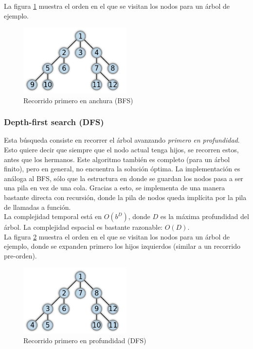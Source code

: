 \documentclass[11pt,a4paper]{article}
\begin{document}
La figura \ref{fig:BFS} muestra el orden en el que se visitan los nodos para un árbol de ejemplo. \\

{
\begin{figure}
  \centering
    \includegraphics[width=0.5\textwidth]{img/BFS}
  \caption{Recorrido primero en anchura (BFS)}
  \label{fig:BFS}
\end{figure}
}
\subsubsection{Depth-first search (DFS)}
Esta búsqueda consiste en recorrer el árbol avanzando \emph{primero en profundidad}. Esto quiere decir que siempre que el nodo actual tenga hijos, se recorren estos, antes que los hermanos. Este algoritmo también es completo (para un árbol finito), pero en general, no encuentra la solución óptima. La implementación es análoga al BFS, sólo que la estructura en donde se guardan los nodos pasa a ser una pila en vez de una cola. Gracias a esto, se implementa de una manera bastante directa con recursión, donde la pila de nodos queda implícita por la pila de llamadas a función. \\

La complejidad temporal está en $O(b^{D})$, donde $D$ es la máxima profundidad del árbol. La complejidad espacial es bastante razonable: $O(D)$. \\

La figura \ref{fig:DFS} muestra el orden en el que se visitan los nodos para un árbol de ejemplo, donde se expanden primero los hijos izquierdos (similar a un recorrido pre-orden). \\

{
\begin{figure}
  \centering
    \includegraphics[width=0.5\textwidth]{img/DFS}
  \caption{Recorrido primero en profundidad (DFS)}
  \label{fig:DFS}
\end{figure}
}
\end{document}
